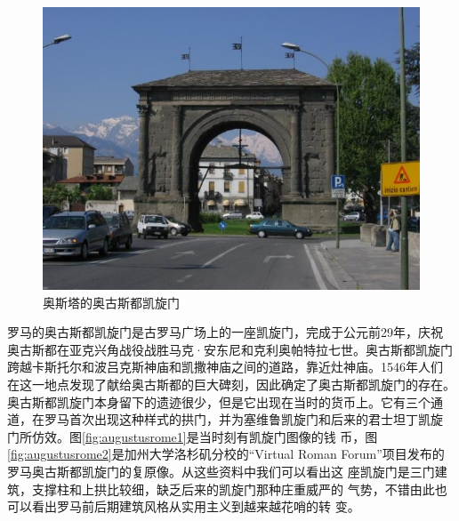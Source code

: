 \documentclass[a4paper,dvipdfm]{article}
\begin{document}
\begin{figure}[hbt!]
  \centering
  \includegraphics[width=\textwidth]{ArchOfAugustusInAosta}
  \caption{奥斯塔的奥古斯都凯旋门}
  \label{fig:augustusaosta}
\end{figure}

罗马的奥古斯都凯旋门是古罗马广场上的一座凯旋门，完成于公元前29年，庆祝
奥古斯都在亚克兴角战役战胜马克·安东尼和克利奥帕特拉七世。奥古斯都凯旋门
跨越卡斯托尔和波吕克斯神庙和凯撒神庙之间的道路，靠近灶神庙。1546年人们
在这一地点发现了献给奥古斯都的巨大碑刻，因此确定了奥古斯都凯旋门的存在。
奥古斯都凯旋门本身留下的遗迹很少，但是它出现在当时的货币上。它有三个通
道，在罗马首次出现这种样式的拱门，并为塞维鲁凯旋门和后来的君士坦丁凯旋
门所仿效。图\ref{fig:augustusrome1}是当时刻有凯旋门图像的钱
币，图\ref{fig:augustusrome2}是加州大学洛杉矶分校的``Virtual Roman
Forum''项目发布的罗马奥古斯都凯旋门的复原像。从这些资料中我们可以看出这
座凯旋门是三门建筑，支撑柱和上拱比较细，缺乏后来的凯旋门那种庄重威严的
气势，不错由此也可以看出罗马前后期建筑风格从实用主义到越来越花哨的转
变。
\end{document}
